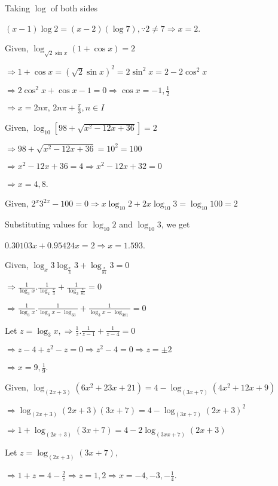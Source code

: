   Taking $\log$ of both sides

  $(x - 1)\log 2 = (x - 2)(\log 7), \because 2\neq 7 \Rightarrow x = 2$.
\item Given, $\log_{\sqrt{2}\sin x}(1 + \cos x) = 2$

  $\Rightarrow 1 + \cos x = (\sqrt{2}\sin x)^2 = 2\sin^2x = 2 - 2\cos^2 x$

  $\Rightarrow 2\cos^2x + \cos x - 1 = 0 \Rightarrow \cos x = -1, \frac{1}{2}$

  $\Rightarrow x = 2n\pi,\,2n\pi + \frac{\pi}{3}, n\in I$
\item Given, $\log_{10}[98 + \sqrt{x^2 - 12x + 36}] = 2$

  $\Rightarrow 98 + \sqrt{x^2 - 12x + 36} = 10^2 = 100$

  $\Rightarrow x^2 - 12x + 36 = 4 \Rightarrow x^2 - 12x + 32 = 0$

  $\Rightarrow x = 4, 8$.
\item Given, $2^x3^{2x} - 100 = 0 \Rightarrow x\log_{10}2 + 2x\log_{10}3 = \log_{10}100 = 2$

  Substituting values for $\log_{10}2$ and $\log_{10}3$, we get

  $0.30103x + 0.95424x = 2 \Rightarrow x = 1.593$.
\item Given, $\log_x3\log_{\tfrac{x}{3}}3 + \log_{\tfrac{x}{81}}3 = 0$

  $\Rightarrow \frac{1}{\log_3x}.\frac{1}{\log_x\tfrac{x}{3}} + \frac{1}{\log_3\tfrac{x}{81}} = 0$

  $\Rightarrow \frac{1}{\log_3x}.\frac{1}{\log_3x - \log_33} + \frac{1}{\log_3x - \log_381} = 0$

  Let $z = \log_3x, \Rightarrow \frac{1}{z}.\frac{1}{z - 1} + \frac{1}{z - 4} = 0$

  $\Rightarrow z - 4 + z^2 - z = 0 \Rightarrow z^2 - 4 = 0 \Rightarrow z = \pm 2$

  $\Rightarrow x = 9, \frac{1}{9}$.
\item Given, $\log_{(2x + 3)}(6x^2 + 23x + 21) = 4 - \log_{(3x + 7)}(4x^2 + 12x + 9)$

  $\Rightarrow \log_{(2x + 3)}(2x + 3)(3x + 7) = 4 - \log_{(3x + 7)}(2x + 3)^2$

  $\Rightarrow 1 + \log_{(2x + 3)}(3x + 7) = 4 - 2\log_{(3xx + 7)}(2x + 3)$

  Let $z = \log_{(2x + 3)}(3x + 7)$,

  $\Rightarrow 1 + z = 4 - \frac{2}{z}\Rightarrow z = 1, 2 \Rightarrow x = -4, -3, -\frac{1}{4}$.

